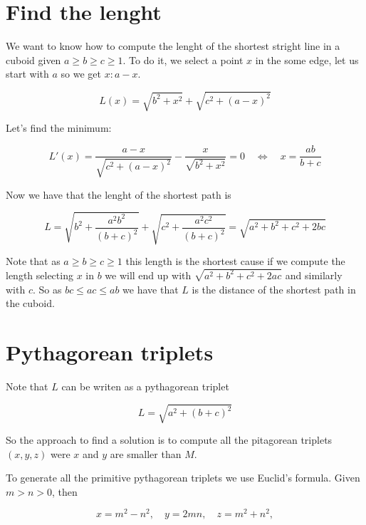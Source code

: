 \documentclass[10pt, a4paper]{article}		%
\theoremstyle{plain}
\theoremstyle{definition}
\begin{document}
\section{Find the lenght}

We want to know how to compute the lenght of the shortest stright line in a cuboid given $a \geq b \geq c \geq 1$.
To do it, we select a point $x$ in the some edge, let us start with $a$ so we get $x : a - x$.

\begin{equation}
    L(x) = \sqrt{b^2 + x^2} + \sqrt{c^2 + (a - x)^2}
\end{equation}

Let's find the minimum:

\begin{equation}
    L'(x) = \frac{a - x}{\sqrt{c^2 + (a - x)^2}} - \frac{x}{\sqrt{b^2 + x^2}} = 0
    \quad\Longleftrightarrow\quad
    x = \frac{ab}{b + c}
\end{equation}

Now we have that the lenght of the shortest path is

\begin{equation}
    L
    = \sqrt{b^2 + \frac{a^2 b^2}{(b + c)^2}} + \sqrt{c^2 + \frac{a^2 c^2}{(b + c)^2}}
    = \sqrt{a^2 + b^2 + c^2 + 2bc}
\end{equation}

Note that as $a \geq b \geq c \geq 1$ this length is the shortest cause if we compute the length selecting $x$ in $b$ we will end up with $\sqrt{a^2 + b^2 + c^2 + 2ac}$ and similarly with $c$.
So as $bc \leq ac \leq ab$ we have that $L$ is the distance of the shortest path in the cuboid.

\section{Pythagorean triplets}

Note that $L$ can be writen as a pythagorean triplet

\begin{equation}
    L
    = \sqrt{a^2 + (b + c)^2}
\end{equation}

So the approach to find a solution is to compute all the pitagorean triplets $(x,y,z)$ were $x$ and $y$ are smaller than $M$.

To generate all the primitive pythagorean triplets we use Euclid's formula. Given $m > n > 0$, then

\begin{equation}
    x = m^2 - n^2, \quad
    y = 2mn, \quad
    z = m^2 + n^2,
\end{equation}
\end{document}
